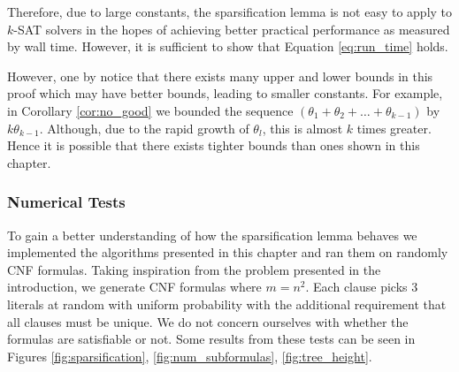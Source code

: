 Therefore, due to large constants, the sparsification lemma is not easy to apply to $k$-SAT solvers
in the hopes of achieving better practical performance as measured by wall time. However, it is sufficient
to show that Equation \ref{eq:run_time} holds.

However, one by notice that there exists many upper and lower bounds in this proof which may have better bounds,
leading to smaller constants. For example, in Corollary \ref{cor:no_good} we bounded the sequence $(\theta_1 + \theta_2 + \dots + \theta_{k-1})$
by $k \theta_{k-1}$. Although, due to the rapid growth of $\theta_l$, this is almost $k$ times greater.
Hence it is possible that there exists tighter bounds than ones shown in this chapter.

\subsubsection{Numerical Tests}
To gain a better understanding of how the sparsification lemma behaves we implemented
the algorithms presented in this chapter and ran them on randomly CNF formulas.
Taking inspiration from the problem presented in the introduction, we generate CNF
formulas where $m = n^2$. Each clause picks 3 literals at random with uniform probability
with the additional requirement that all clauses must be unique. We do not concern ourselves
with whether the formulas are satisfiable or not.
Some results from these tests can be seen in Figures \ref{fig:sparsification}, \ref{fig:num_subformulas}, \ref{fig:tree_height}.

